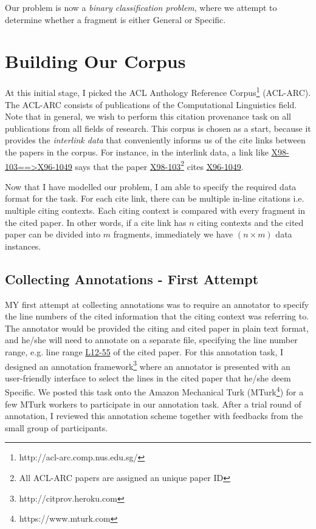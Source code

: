 Our problem is now a \textit{binary classification problem}, where we attempt to determine whether a fragment is either General or Specific.

\section{Building Our Corpus}
At this initial stage, I picked the ACL Anthology Reference Corpus\footnote{http://acl-arc.comp.nus.edu.sg/} (ACL-ARC). The ACL-ARC consists of publications of the Computational Linguistics field. Note that in general, we wish to perform this citation provenance task on all publications from all fields of research. This corpus is chosen as a start, because it provides the \textit{interlink data} that conveniently informs us of the cite links between the papers in the corpus. For instance, in the interlink data, a link like \url{X98-103==>X96-1049} says that the paper \url{X98-103}\footnote{All ACL-ARC papers are assigned an unique paper ID} cites \url{X96-1049}.

Now that I have modelled our problem, I am able to specify the required data format for the task. For each cite link, there can be multiple in-line citations i.e. multiple citing contexts. Each citing context is compared with every fragment in the cited paper. In other words, if a cite link has $n$ citing contexts and the cited paper can be divided into $m$ fragments, immediately we have $(n \times m)$ data instances.

\subsection{Collecting Annotations - First Attempt}
MY first attempt at collecting annotations was to require an annotator to specify the line numbers of the cited information that the citing context was referring to. The annotator would be provided the citing and cited paper in plain text format, and he/she will need to annotate on a separate file, specifying the line number range, e.g. line range \url{L12-55} of the cited paper. For this annotation task, I designed an annotation framework\footnote{http://citprov.heroku.com} where an annotator is presented with an user-friendly interface to select the lines in the cited paper that he/she deem Specific. We posted this task onto the Amazon Mechanical Turk (MTurk\footnote{https://www.mturk.com}) for a few MTurk workers to participate in our annotation task. After a trial round of annotation, I reviewed this annotation scheme together with feedbacks from the small group of participants.

